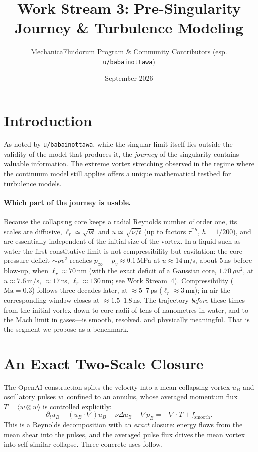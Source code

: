 \documentclass[11pt]{article}
\title{Work Stream 3: Pre-Singularity Journey \& Turbulence Modeling}
\author{MechanicaFluidorum Program \& Community Contributors (esp. \texttt{u/babainottawa})}
\date{September 2026}
\begin{document}
\maketitle

\section{Introduction}
As noted by \texttt{u/babainottawa}, while the singular limit itself lies outside the validity of the model that produces it, the \emph{journey} of the singularity contains valuable information. The extreme vortex stretching observed in the regime where the continuum model still applies offers a unique mathematical testbed for turbulence models.

\paragraph{Which part of the journey is usable.} Because the collapsing core keeps a radial Reynolds number of order one, its scales are diffusive, $\ell_r \simeq \sqrt{\nu t}$ and $u \simeq \sqrt{\nu/t}$ (up to factors $\tau^{\mp h}$, $h = 1/200$), and are essentially independent of the initial size of the vortex. In a liquid such as water the first constitutive limit is not compressibility but cavitation: the core pressure deficit $\sim\rho u^2$ reaches $p_\infty - p_v \approx 0.1$\,MPa at $u \approx 14$\,m/s, about $5$\,ns before blow-up, when $\ell_r \approx 70$\,nm (with the exact deficit of a Gaussian core, $1.70\,\rho u^2$, at $u\approx7.6$\,m/s, $\approx17$\,ns, $\ell_r\approx130$\,nm; see Work Stream~4). Compressibility ($\mathrm{Ma}=0.3$) follows three decades later, at $\approx 5$--$7$\,ps ($\ell_r \approx 3$\,nm); in air the corresponding window closes at $\approx 1.5$--$1.8$\,ns. The trajectory \emph{before} these times---from the initial vortex down to core radii of tens of nanometres in water, and to the Mach limit in gases---is smooth, resolved, and physically meaningful. That is the segment we propose as a benchmark.

\section{An Exact Two-Scale Closure}
The OpenAI construction splits the velocity into a mean collapsing vortex $u_B$ and oscillatory pulses $w$, confined to an annulus, whose averaged momentum flux $T = \langle w \otimes w \rangle$ is controlled explicitly:
\begin{equation}
    \partial_t u_B + (u_B\cdot\nabla)u_B - \nu\Delta u_B + \nabla p_B = -\nabla\cdot T + f_{\text{smooth}}.
\end{equation}
This is a Reynolds decomposition with an \emph{exact} closure: energy flows from the mean shear into the pulses, and the averaged pulse flux drives the mean vortex into self-similar collapse. Three concrete uses follow.
\end{document}
